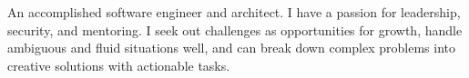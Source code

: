 An accomplished software engineer and architect. I have a passion for leadership, security, and mentoring. I seek out
challenges as opportunities for growth, handle ambiguous and fluid situations well, and can break down complex problems
into creative solutions with actionable tasks.
